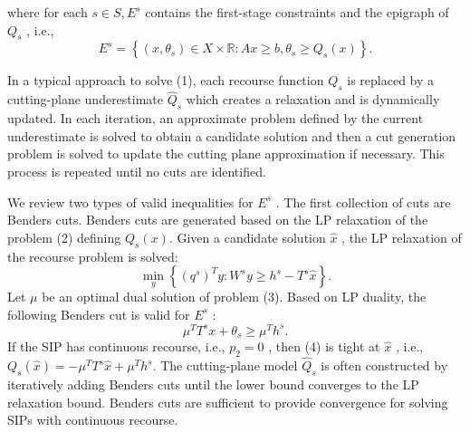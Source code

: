 \documentclass{article}
\theoremstyle{plain}
\theoremstyle{definition}
\begin{document}
where for each  $s \in S, E^{s}$  contains the first-stage constraints and the epigraph of  $Q_{s}$ , i.e., 
$$E^{s}=\left\{\left(x, \theta_{s}\right) \in X \times \mathbb{R}: A x \geq b, \theta_{s} \geq Q_{s}(x)\right\}.$$

In a typical approach to solve (1), each recourse function  $Q_{s}$  is replaced by a cutting-plane underestimate  $\hat{Q}_{s}$  which creates a relaxation and is dynamically updated. In each iteration, an approximate problem defined by the current underestimate is solved to obtain a candidate solution and then a cut generation problem is solved to update the cutting plane approximation if necessary. This process is repeated until no cuts are identified.

We review two types of valid inequalities for  $E^{s}$ . The first collection of cuts are Benders cuts. Benders cuts are generated based on the LP relaxation of the problem (2) defining  $Q_{s}(x)$. Given a candidate solution  $\hat{x}$ , the LP relaxation of the recourse problem is solved:
\begin{equation}
\min _{y}\left\{\left(q^{s}\right)^{T} y: W^{s} y \geq h^{s}-T^{s} \hat{x}\right\}.
\end{equation}
Let  $\mu$  be an optimal dual solution of problem (3). Based on LP duality, the following Benders cut is valid for  $E^{s}$  :
\begin{equation}\mu^{T} T^{s} x+\theta_{s} \geq \mu^{T} h^{s} .
\end{equation}
If the SIP has continuous recourse, i.e.,  $p_2=0$ , then (4) is tight at  $\hat{x}$ , i.e.,  $Q_{s}(\hat{x})=-\mu^{T} T^{s} \hat{x}+\mu^{T} h^{s} $. The cutting-plane model  $\hat{Q}_{s}$  is often constructed by iteratively adding Benders cuts until the lower bound converges to the LP relaxation bound. Benders cuts are sufficient to provide convergence for solving SIPs with continuous recourse.
\end{document}
